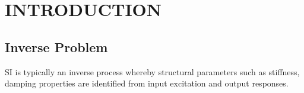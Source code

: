 \documentclass[BTech]{srmuthesis}
\begin{document}
\pagebreak
\clearpage



\chapter{INTRODUCTION}
\label{chap:intro}
\section{Inverse Problem}
 \ac{SI} is typically an inverse process whereby structural parameters such as stiffness, damping properties are identified from input excitation and output responses.
 
\end{document}
